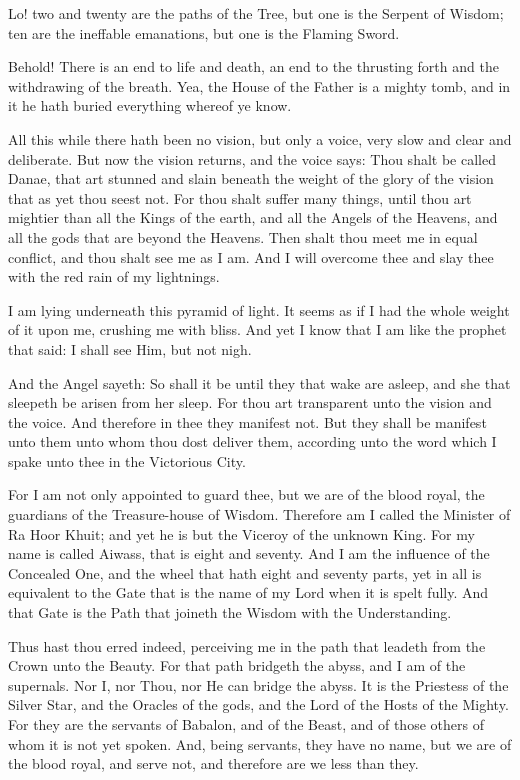 

Lo! two and twenty are the paths of the Tree, but one is the Serpent of Wisdom; ten are the ineffable emanations, but one is the Flaming Sword.

Behold! There is an end to life and death, an end to the thrusting forth and the withdrawing of the breath. Yea, the House of the Father is a mighty tomb, and in it he hath buried everything whereof ye know.

All this while there hath been no vision, but only a voice, very slow and clear and deliberate. But now the vision returns, and the voice says: Thou shalt be called Danae, that art stunned and slain beneath the weight of the glory of the vision that as yet thou seest not. For thou shalt suffer many things, until thou art mightier than all the Kings of the earth, and all the Angels of the Heavens, and all the gods that are beyond the Heavens. Then shalt thou meet me in equal conflict, and thou shalt see me as I am. And I will overcome thee and slay thee with the red rain of my lightnings.

I am lying underneath this pyramid of light. It seems as if I had the whole weight of it upon me, crushing me with bliss. And yet I know that I am like the prophet that said: I shall see Him, but not nigh.

And the Angel sayeth: So shall it be until they that wake are asleep, and she that sleepeth be arisen from her sleep. For thou art transparent unto the vision and the voice. And therefore in thee they manifest not. But they shall be manifest unto them unto whom thou dost deliver them, according unto the word which I spake unto thee in the Victorious City.

For I am not only appointed to guard thee, but we are of the blood royal, the guardians of the Treasure-house of Wisdom. Therefore am I called the Minister of Ra Hoor Khuit; and yet he is but the Viceroy of the unknown King. For my name is called Aiwass, that is eight and seventy. And I am the influence of the Concealed One, and the wheel that hath eight and seventy parts, yet in all is equivalent to the Gate that is the name of my Lord when it is spelt fully. And that Gate is the Path that joineth the Wisdom with the Understanding.

Thus hast thou erred indeed, perceiving me in the path that leadeth from the Crown unto the Beauty. For that path bridgeth the abyss, and I am of the supernals. Nor I, nor Thou, nor He can bridge the abyss. It is the Priestess of the Silver Star, and the Oracles of the gods, and the Lord of the Hosts of the Mighty. For they are the servants of Babalon, and of the Beast, and of those others of whom it is not yet spoken. And, being servants, they have no name, but we are of the blood royal, and serve not, and therefore are we less than they.

